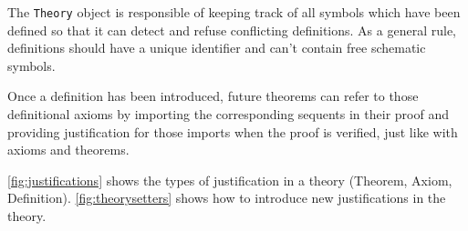 The \lstinline|Theory|{} object is responsible of keeping track of all symbols which have been defined so that it can detect and refuse conflicting definitions. As a general rule, definitions should have a unique identifier and can't contain free schematic symbols.

Once a definition has been introduced, future theorems can refer to those definitional axioms by importing the corresponding sequents in their proof and providing justification for those imports when the proof is verified, just like with axioms and theorems.

\autoref{fig:justifications} shows the types of justification in a theory (Theorem, Axiom, Definition). \autoref{fig:theorysetters} shows how to introduce new justifications in the theory.



